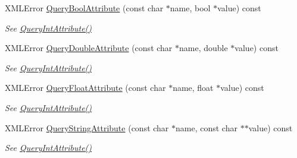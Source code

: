 \begin{DoxyCompactItemize}
\mbox{\label{classCPlantBox_1_1tinyxml2_1_1XMLElement_a584da344269cfb1cdef21b5e6b517156}} 
X\+M\+L\+Error \hyperlink{classCPlantBox_1_1tinyxml2_1_1XMLElement_a584da344269cfb1cdef21b5e6b517156}{Query\+Bool\+Attribute} (const char $\ast$name, bool $\ast$value) const
\begin{DoxyCompactList}\small\item\em See \hyperlink{classCPlantBox_1_1tinyxml2_1_1XMLElement_adb0a6e52cb23f9226fa31af9eaebfd72}{Query\+Int\+Attribute()} \end{DoxyCompactList}\item 
\mbox{\label{classCPlantBox_1_1tinyxml2_1_1XMLElement_a9d366c8ce938a81ac5ec47a020aa7729}} 
X\+M\+L\+Error \hyperlink{classCPlantBox_1_1tinyxml2_1_1XMLElement_a9d366c8ce938a81ac5ec47a020aa7729}{Query\+Double\+Attribute} (const char $\ast$name, double $\ast$value) const
\begin{DoxyCompactList}\small\item\em See \hyperlink{classCPlantBox_1_1tinyxml2_1_1XMLElement_adb0a6e52cb23f9226fa31af9eaebfd72}{Query\+Int\+Attribute()} \end{DoxyCompactList}\item 
\mbox{\label{classCPlantBox_1_1tinyxml2_1_1XMLElement_adadd2700d95ca39bb22caad0092c6024}} 
X\+M\+L\+Error \hyperlink{classCPlantBox_1_1tinyxml2_1_1XMLElement_adadd2700d95ca39bb22caad0092c6024}{Query\+Float\+Attribute} (const char $\ast$name, float $\ast$value) const
\begin{DoxyCompactList}\small\item\em See \hyperlink{classCPlantBox_1_1tinyxml2_1_1XMLElement_adb0a6e52cb23f9226fa31af9eaebfd72}{Query\+Int\+Attribute()} \end{DoxyCompactList}\item 
\mbox{\label{classCPlantBox_1_1tinyxml2_1_1XMLElement_ab29c7dbabbee067354a25716e802f32f}} 
X\+M\+L\+Error \hyperlink{classCPlantBox_1_1tinyxml2_1_1XMLElement_ab29c7dbabbee067354a25716e802f32f}{Query\+String\+Attribute} (const char $\ast$name, const char $\ast$$\ast$value) const
\begin{DoxyCompactList}\small\item\em See \hyperlink{classCPlantBox_1_1tinyxml2_1_1XMLElement_adb0a6e52cb23f9226fa31af9eaebfd72}{Query\+Int\+Attribute()} \end{DoxyCompactList}\item 
$$
\end{DoxyCompactItemize}

